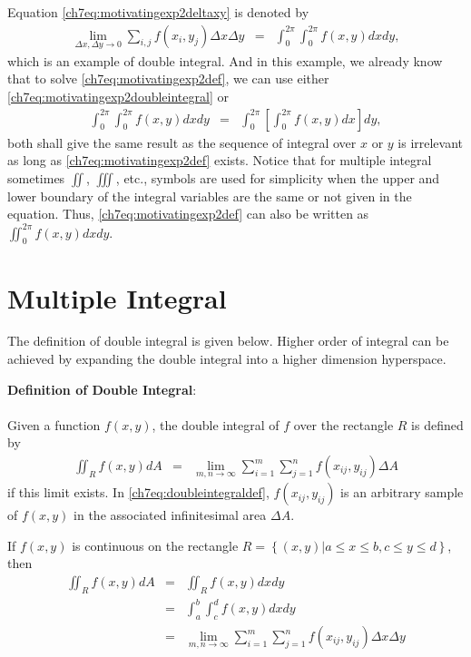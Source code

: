 Equation \eqref{ch7eq:motivatingexp2deltaxy} is denoted by
\begin{eqnarray}
  \lim_{\Delta x, \Delta y \rightarrow 0} \sum_{i,j} f(x_i,y_j) \Delta x \Delta y &=& \int_{0}^{2\pi}\int_{0}^{2\pi} f(x,y) dx dy ,\label{ch7eq:motivatingexp2def}
\end{eqnarray}
which is an example of double integral. And in this example, we already know that to solve \eqref{ch7eq:motivatingexp2def}, we can use either \eqref{ch7eq:motivatingexp2doubleintegral} or
\begin{eqnarray}
  \int_{0}^{2\pi}\int_{0}^{2\pi} f(x,y) dx dy &=& \int_{0}^{2\pi} \left[\int_{0}^{2\pi}f(x,y)dx\right]dy, \nonumber
\end{eqnarray}
both shall give the same result as the sequence of integral over $x$ or $y$ is irrelevant as long as \eqref{ch7eq:motivatingexp2def} exists. Notice that for multiple integral sometimes $\iint$, $\iiint$, etc., symbols are used for simplicity when the upper and lower boundary of the integral variables are the same or not given in the equation. Thus, \eqref{ch7eq:motivatingexp2def} can also be written as $\iint_{0}^{2\pi} f(x,y)dx dy$.

\section{Multiple Integral} \label{ch7sec:multipleintegral}

The definition of double integral is given below. Higher order of integral can be achieved by expanding the double integral into a higher dimension hyperspace.

\begin{VF}
    \textbf{Definition of Double Integral}:
    \\
    \\
Given a function $f(x,y)$, the double integral of $f$ over the rectangle $R$ is defined by
\begin{eqnarray}
  \iint_{R} f(x,y)dA &=& \lim_{m, n\rightarrow \infty}\sum_{i=1}^{m} \sum_{j=1}^{n} f(x_{ij},y_{ij})\Delta A \label{ch7eq:doubleintegraldef}
\end{eqnarray}
if this limit exists. In \eqref{ch7eq:doubleintegraldef}, $f(x_{ij},y_{ij})$ is an arbitrary sample of $f(x,y)$ in the associated infinitesimal area $\Delta A$.

If $f(x,y)$ is continuous on the rectangle $R = \left\{(x,y)| a\leq x \leq b, c \leq y \leq d \right\}$, then
\begin{eqnarray}
  \iint_{R} f(x,y)dA &=& \iint_{R} f(x,y)dx dy \nonumber \\
  &=& \int_{a}^{b}\int_{c}^{d} f(x,y) dxdy \nonumber \\
  &=& \lim_{m, n\rightarrow \infty}\sum_{i=1}^{m} \sum_{j=1}^{n} f(x_{ij},y_{ij})\Delta x \Delta y \label{ch7eq:doubleintegraldefxy}
\end{eqnarray}

\end{VF}

